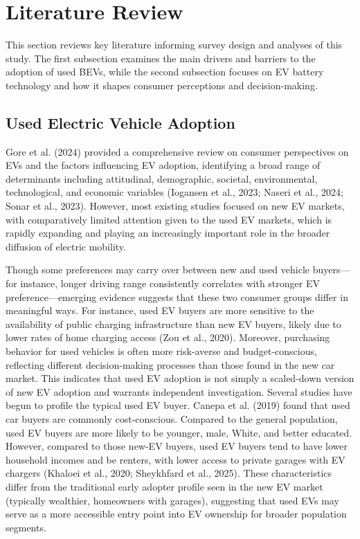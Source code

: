 \documentclass[a4paper,fleqn]{cas-sc}   %
\begin{document}
\section{Literature Review}

This section reviews key literature informing survey design and analyses of this study. The first subsection examines the main drivers and barriers to the adoption of used BEVs, while the second subsection focuses on EV battery technology and how it shapes consumer perceptions and decision-making.

\subsection{Used Electric Vehicle Adoption}

Gore et al. (2024) provided a comprehensive review on consumer perspectives on EVs and the factors influencing EV adoption, identifying a broad range of determinants including attitudinal, demographic, societal, environmental, technological, and economic variables (Iogansen et al., 2023; Naseri et al., 2024; Sonar et al., 2023). However, most existing studies focused on new EV markets, with comparatively limited attention given to the used EV markets, which is rapidly expanding and playing an increasingly important role in the broader diffusion of electric mobility.

Though some preferences may carry over between new and used vehicle buyers—for instance, longer driving range consistently correlates with stronger EV preference—emerging evidence suggests that these two consumer groups differ in meaningful ways. For instance, used EV buyers are more sensitive to the availability of public charging infrastructure than new EV buyers, likely due to lower rates of home charging access (Zou et al., 2020). Moreover, purchasing behavior for used vehicles is often more risk-averse and budget-conscious, reflecting different decision-making processes than those found in the new car market. This indicates that used EV adoption is not simply a scaled-down version of new EV adoption and warrants independent investigation.
Several studies have begun to profile the typical used EV buyer. Canepa et al. (2019) found that used car buyers are commonly cost-conscious. Compared to the general population, used EV buyers are more likely to be younger, male, White, and better educated. However, compared to those new-EV buyers, used EV buyers tend to have lower household incomes and be renters, with lower access to private garages with EV chargers (Khaloei et al., 2020; Sheykhfard et al., 2025). These characteristics differ from the traditional early adopter profile seen in the new EV market (typically wealthier, homeowners with garages), suggesting that used EVs may serve as a more accessible entry point into EV ownership for broader population segments.
\end{document}
